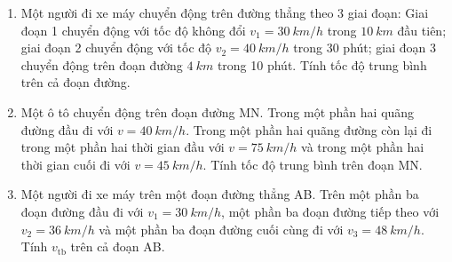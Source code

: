 \begin{enumerate}[label=\bfseries Bài \arabic*:,leftmargin=1.5cm]
	
	\item {}
	
	{
		
		Một người đi xe máy chuyển động trên đường thẳng theo 3 giai đoạn: Giai đoạn 1 chuyển động với tốc độ không đổi $v_1 = \SI{30}{km/h}$ trong $\SI{10}{km}$ đầu tiên; giai đoạn 2 chuyển động với tốc độ $v_2 = \SI{40}{km/h}$ trong 30 phút; giai đoạn 3 chuyển động trên đoạn đường $\SI{4}{km}$ trong 10 phút. Tính tốc độ trung bình trên cả đoạn đường.
	}

	

	\item {}
	
	{
		Một ô tô chuyển động trên đoạn đường MN. Trong một phần hai quãng đường đầu đi với $v = \SI{40}{km/h}$. Trong một phần hai quãng đường còn lại đi trong một phần hai thời gian đầu với $v = \SI{75}{km/h}$ và trong một phần hai thời gian cuối đi với $v = \SI{45}{km/h}$. Tính tốc độ trung bình trên đoạn MN.
	}
	
	\item {}
	
	{
		
		Một người đi xe máy trên một đoạn đường thẳng AB. Trên một phần ba đoạn đường đầu đi với $v_1 = \SI{30}{km/h}$, một phần ba đoạn đường tiếp theo với $v_2 = \SI{36}{km/h}$ và một phần ba đoạn đường cuối cùng đi với $v_3= \SI{48}{km/h}$. Tính $v_\text{tb}$ trên cả đoạn AB.
		
	}
\end{enumerate}